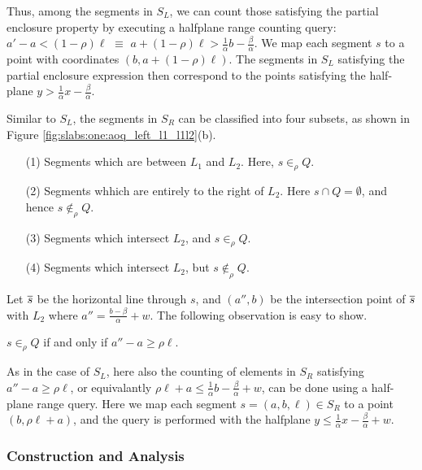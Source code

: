 Thus, among the segments in $S_L$, we can count those satisfying the 
partial enclosure property by executing a halfplane range counting query:
$a' - a < (1 - \rho)\ell$ $\equiv$ $a + (1 - \rho)\ell > \frac{1}{\alpha} b - 
\frac{\beta}{\alpha}$. We map each segment $s$ to a point with coordinates 
$(b, a + (1-\rho)\ell)$. The segments in $S_L$ 
satisfying the partial enclosure expression then correspond to the points 
satisfying the half-plane $y > \frac{1}{\alpha}x - \frac{\beta}{\alpha}$.


Similar to $S_L$, the segments in $S_R$ can be classified into four subsets, 
as shown in Figure \ref{fig:slabs:one:aoq_left_l1_l1l2}(b).



\begin{itemize}
 \item[(1)] Segments which are between $L_1$ and $L_2$. Here, $s \in_\rho Q$.
 \item[(2)] Segments whhich are entirely to the right of $L_2$. Here $s \cap Q = \emptyset$, 
 and hence $s \not \in_\rho Q$.
 \item[(3)] Segments which intersect $L_2$, and $s \in_\rho Q$.
 \item[(4)] Segments which intersect $L_2$, but $s \not \in_\rho Q$.
\end{itemize}
Let $\overline{s}$ be the horizontal line through $s$, and $(a'', b)$ be the 
intersection point of $\overline{s}$ with $L_2$ where $a'' = \frac{b - 
\beta}{\alpha}
 + w$. The following observation is easy to show.
\begin{observation} 
$s \in_\rho Q$ if and only if 
 $a'' - a \geq \rho \ell$.
\end{observation}
As in the case of $S_L$, here also the counting of elements in $S_R$ 
satisfying $a'' - a \geq \rho \ell$, or equivalantly $\rho \ell + a 
\leq \frac{1}{\alpha} b - \frac{\beta}{\alpha} + w$, can be done using 
a half-plane range query. Here we map each segment $s=(a,b,\ell)\in 
S_R$ to a point $(b, \rho \ell + a)$, and the query is performed with 
the halfplane  $y \leq \frac{1}{\alpha} x - \frac{\beta}{\alpha} + w$.

\subsubsection{Construction and Analysis}
\label{:slabs:one:analysis}

